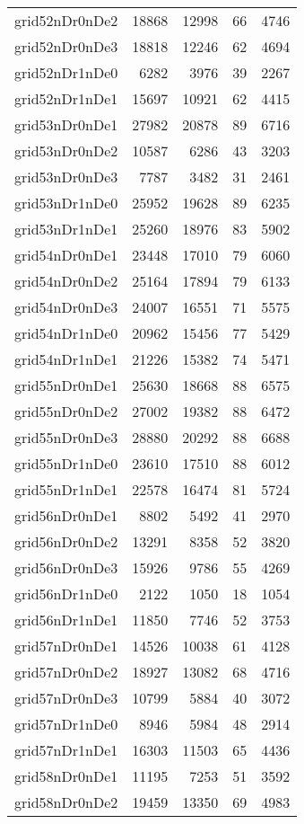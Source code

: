 \begin{tabular}{lrrrr}
grid52nDr0nDe2 & 18868 & 12998 & 66 & 4746 \\
grid52nDr0nDe3 & 18818 & 12246 & 62 & 4694 \\
grid52nDr1nDe0 & 6282 & 3976 & 39 & 2267 \\
grid52nDr1nDe1 & 15697 & 10921 & 62 & 4415 \\
grid53nDr0nDe1 & 27982 & 20878 & 89 & 6716 \\
grid53nDr0nDe2 & 10587 & 6286 & 43 & 3203 \\
grid53nDr0nDe3 & 7787 & 3482 & 31 & 2461 \\
grid53nDr1nDe0 & 25952 & 19628 & 89 & 6235 \\
grid53nDr1nDe1 & 25260 & 18976 & 83 & 5902 \\
grid54nDr0nDe1 & 23448 & 17010 & 79 & 6060 \\
grid54nDr0nDe2 & 25164 & 17894 & 79 & 6133 \\
grid54nDr0nDe3 & 24007 & 16551 & 71 & 5575 \\
grid54nDr1nDe0 & 20962 & 15456 & 77 & 5429 \\
grid54nDr1nDe1 & 21226 & 15382 & 74 & 5471 \\
grid55nDr0nDe1 & 25630 & 18668 & 88 & 6575 \\
grid55nDr0nDe2 & 27002 & 19382 & 88 & 6472 \\
grid55nDr0nDe3 & 28880 & 20292 & 88 & 6688 \\
grid55nDr1nDe0 & 23610 & 17510 & 88 & 6012 \\
grid55nDr1nDe1 & 22578 & 16474 & 81 & 5724 \\
grid56nDr0nDe1 & 8802 & 5492 & 41 & 2970 \\
grid56nDr0nDe2 & 13291 & 8358 & 52 & 3820 \\
grid56nDr0nDe3 & 15926 & 9786 & 55 & 4269 \\
grid56nDr1nDe0 & 2122 & 1050 & 18 & 1054 \\
grid56nDr1nDe1 & 11850 & 7746 & 52 & 3753 \\
grid57nDr0nDe1 & 14526 & 10038 & 61 & 4128 \\
grid57nDr0nDe2 & 18927 & 13082 & 68 & 4716 \\
grid57nDr0nDe3 & 10799 & 5884 & 40 & 3072 \\
grid57nDr1nDe0 & 8946 & 5984 & 48 & 2914 \\
grid57nDr1nDe1 & 16303 & 11503 & 65 & 4436 \\
grid58nDr0nDe1 & 11195 & 7253 & 51 & 3592 \\
grid58nDr0nDe2 & 19459 & 13350 & 69 & 4983 \\

\end{tabular}
